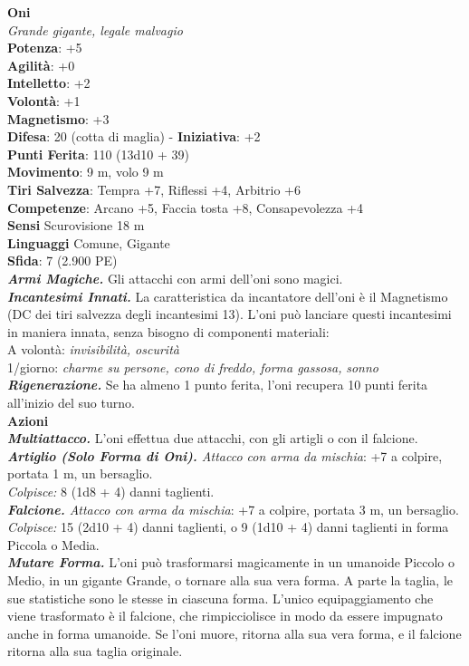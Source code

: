 \begin{multicols}{2}
\medskip\textbf{Oni}\\
\emph{Grande gigante, legale malvagio}\\
\textbf{Potenza}: +5\\
\textbf{Agilità}: +0\\
\textbf{Intelletto}: +2\\
\textbf{Volontà}: +1\\
\textbf{Magnetismo}: +3\\
\textbf{Difesa}: 20 (cotta di maglia) - \textbf{Iniziativa}: +2\\
\textbf{Punti Ferita}: 110 (13d10 + 39)\\
\textbf{Movimento}: 9 m, volo 9 m  \\
\textbf{Tiri Salvezza}: Tempra +7, Riflessi +4, Arbitrio +6\\
\textbf{Competenze}: Arcano +5, Faccia tosta +8, Consapevolezza +4\\
\textbf{Sensi} Scurovisione 18 m\\
\textbf{Linguaggi} Comune, Gigante\\
\textbf{Sfida}: 7 (2.900 PE)\smallskip\\
\emph{\textbf{Armi Magiche.}} Gli attacchi con armi dell'oni sono magici.\\
\emph{\textbf{Incantesimi Innati.}} La caratteristica da incantatore dell'oni è il Magnetismo (DC dei tiri salvezza degli incantesimi 13). L'oni può lanciare questi incantesimi in maniera innata, senza bisogno di componenti materiali:\\
A volontà: \emph{invisibilità, oscurità}\\
1/giorno: \emph{charme su persone, cono di freddo, forma gassosa,} \emph{sonno}\\
\emph{\textbf{Rigenerazione.}} Se ha almeno 1 punto ferita, l'oni recupera 10 punti ferita all'inizio del suo turno.\\
\smallskip\textbf{Azioni}\\
\emph{\textbf{Multiattacco.}} L'oni effettua due attacchi, con gli artigli o con il falcione.\\
\emph{\textbf{Artiglio (Solo Forma di Oni).} Attacco con arma da mischia}: +7 a colpire, portata 1 m, un bersaglio.\\
\emph{Colpisce:} 8 (1d8 + 4) danni taglienti.\\
\emph{\textbf{Falcione.} Attacco con arma da mischia}: +7 a colpire, portata 3 m, un bersaglio.\\
\emph{Colpisce:} 15 (2d10 + 4) danni taglienti, o 9 (1d10 + 4) danni taglienti in forma Piccola o Media.\\
\emph{\textbf{Mutare Forma.}} L'oni può trasformarsi magicamente in un umanoide Piccolo o Medio, in un gigante Grande, o tornare alla sua vera forma. A parte la taglia, le sue statistiche sono le stesse in ciascuna forma. L'unico equipaggiamento che viene trasformato è il falcione, che rimpicciolisce in modo da essere impugnato anche in forma umanoide. Se l'oni muore, ritorna alla sua vera forma, e il falcione ritorna alla sua taglia originale.\\


\end{multicols}
